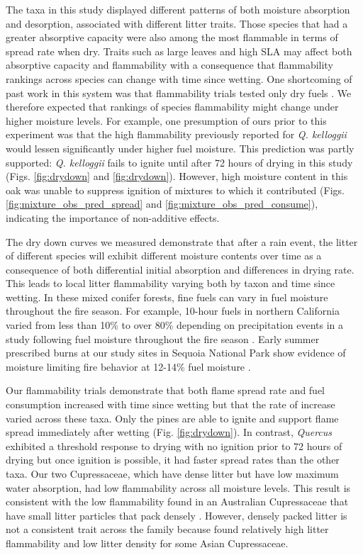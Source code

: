 \documentclass[letterpaper,12pt]{article}
\begin{document}
The taxa in this study displayed different patterns of both moisture absorption
and desorption, associated with different litter traits. Those species that had
a greater absorptive capacity were also among the most flammable in terms of
spread rate when dry. Traits such as large leaves and high SLA may affect both
absorptive capacity and flammability with a consequence that flammability
rankings across species can change with time since wetting. One shortcoming of
past work in this system was that flammability trials tested only dry fuels
\citep{Magalhaes+Schwilk-2012}. We therefore expected that rankings of species
flammability might change under higher moisture levels. For example, one
presumption of ours prior to this experiment was that the high flammability
previously reported for \emph{Q. kelloggii} \citep{Magalhaes+Schwilk-2012}
would lessen significantly under higher fuel moisture. This prediction
was partly supported: \emph{Q. kelloggii} fails to ignite until after 72 hours
of drying in this study (Figs. \ref{fig:drydown} and \ref{fig:drydown}).
However, high moisture content in this oak was unable to suppress ignition of
mixtures to which it contributed (Figs. \ref{fig:mixture_obs_pred_spread} and
\ref{fig:mixture_obs_pred_consume}), indicating the importance of non-additive
effects.

The dry down curves we measured demonstrate that after a rain event, the litter
of different species will exhibit different moisture contents over time as a
consequence of both differential initial absorption and differences in drying
rate. This leads to local litter flammability varying both by taxon and time
since wetting. In these mixed conifer forests, fine fuels can vary in fuel
moisture throughout the fire season. For example, 10-hour fuels in northern
California varied from less than 10\% to over 80\% depending on precipitation
events in a study following fuel moisture throughout the fire season
\citep{Estes+Knapp+etal-2012}. Early summer prescribed burns at our study sites
in Sequoia National Park show evidence of moisture limiting fire behavior at
12-14\% fuel moisture \citep{Knapp+Keeley+etal-2005}.

Our flammability trials demonstrate that both flame spread rate and fuel
consumption increased with time since wetting but that the rate of increase
varied across these taxa. Only the pines are able to ignite and support flame
spread immediately after wetting (Fig. \ref{fig:drydown}). In contrast,
\emph{Quercus} exhibited a threshold response to drying with no ignition prior
to 72 hours of drying but once ignition is possible, it had faster spread rates
than the other taxa. Our two Cupressaceae, which have dense litter but have low
maximum water absorption, had low flammability across all moisture levels. This
result is consistent with the low flammability found in an Australian
Cupressaceae that have small litter particles that pack densely
\citep{Scarff+Westoby-2006, Bowman+Haverkamp+etal-2018}. However, densely
packed litter is not a consistent trait across the family because
\citet{Cornwell+Elvira+etal-2015} found relatively high litter flammability and
low litter density for some Asian Cupressaceae.
\end{document}
